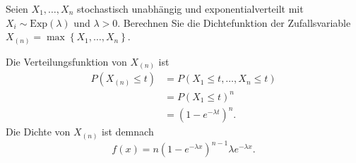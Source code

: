  Seien $X_1, \dots, X_n$
stochastisch unabhängig und exponentialverteilt mit $X_i\sim
\text{Exp}(\lambda)$ und $\lambda>0$. Berechnen Sie die Dichtefunktion der
Zufallsvariable $X_{(n)} = \max \left\{ X_1,\dots ,X_n \right\}$.

\solution Die Verteilungsfunktion von $X_{(n)}$ ist 
\begin{align*}
    P\left( X_{(n)} \leq t \right) &= P\left( X_1 \leq t,\dots ,X_n \leq t \right) \\
    &= P\left( X_1 \leq t \right)^{n} \\
    &= \left( 1- e^{-\lambda t} \right)^{n}. 
\end{align*}
Die Dichte von $X_{(n)}$ ist demnach
\begin{equation*}
    f(x) = n \left( 1- e^{-\lambda x} \right)^{n-1} \lambda e^{-\lambda x}. 
\end{equation*}



